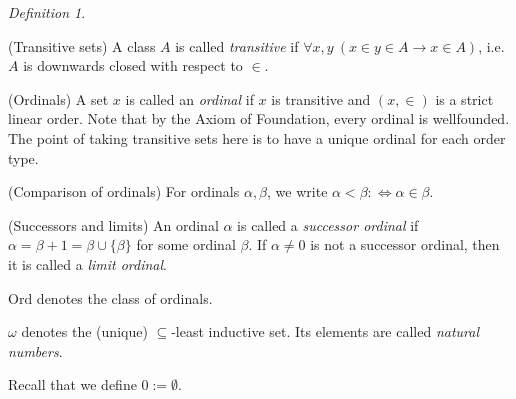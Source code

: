 \documentclass[a4paper, 11pt]{amsart}
\theoremstyle{remark}
\newtheorem{definition}[definition]{Definition}
\newcommand{\Ord}{\mathrm{Ord}}
\newcommand{\pred}{\mathrm{pred}}
\newenvironment{enumerate-(1)}{\begin{enumerate}[label={\upshape (\arabic*)}, leftmargin=2pc]}{\end{enumerate}}
\begin{document}
\begin{definition} \ 
\begin{enumerate-(1)} 
\item (Transitive sets) 
A class $A$ is called \emph{transitive} if $\forall x,y\ (x\in y\in A \rightarrow x\in A)$, i.e. $A$ is downwards closed with respect to $\in$. 
\item 
(Ordinals) 
A set $x$ is called an \emph{ordinal} if $x$ is transitive and $(x,\in)$ is a strict linear order. 
Note that by the Axiom of Foundation, every ordinal is wellfounded. 
The point of taking transitive sets here is to have a unique ordinal for each order type. 
\item 
(Comparison of ordinals) 
For ordinals $\alpha, \beta$, we write $\alpha< \beta :\Longleftrightarrow \alpha\in \beta$. 
\item 
(Successors and limits) 
An ordinal $\alpha$ is called a \emph{successor ordinal} if $\alpha=\beta+1= \beta\cup \{\beta\}$ for some ordinal $\beta$. 
If $\alpha\neq 0$ is not a successor ordinal, then it is called a \emph{limit ordinal}. 
\item 
$\Ord$ denotes the class of ordinals. 
\item 
$\omega$ denotes the (unique) $\subseteq$-least inductive set. 
Its elements are called \emph{natural numbers}. 
\end{enumerate-(1)} 
\end{definition} 


Recall that we define $0:=\emptyset$. 
\end{document}

